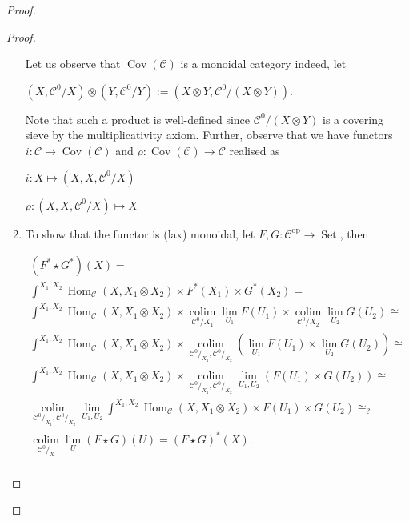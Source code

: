 \documentclass[8pt]{article}
\theoremstyle{definition}
\theoremstyle{definition}
\theoremstyle{definition}
\theoremstyle{definition}
\theoremstyle{definition}
\theoremstyle{definition}
\theoremstyle{definition}
\theoremstyle{definition}
\theoremstyle{definition}
\theoremstyle{definition}
\theoremstyle{definition}
\theoremstyle{definition}
\theoremstyle{definition}
\theoremstyle{question}
\DeclareMathOperator*{\colim}{\operatorname{colim}}
\begin{document}
\begin{proof}
\begin{proof}
\begin{enumerate}
    Let us observe that $\operatorname{Cov}(\mathcal{C})$ is a monoidal category indeed, let
    \begin{center}
      $(X, \mathcal{C}^{0}/X) \otimes (Y, \mathcal{C}^{0}/Y) := (X \otimes Y, \mathcal{C}^{0}/(X \otimes Y))$.
    \end{center}
    Note that such a product is well-defined since $\mathcal{C}^{0}/(X \otimes Y)$ is a covering sieve by the multiplicativity axiom.
    Further, observe that we have functors $i : \mathcal{C} \to \operatorname{Cov}(\mathcal{C})$ and $\rho : \operatorname{Cov}(\mathcal{C}) \to \mathcal{C}$
    realised as
    \begin{center}
      $i : X \mapsto (X, X, \mathcal{C}^{0}/X)$

      $\rho : (X, X, \mathcal{C}^{0}/X) \mapsto X$
    \end{center}
 
    
    \item To show that the functor is (lax) monoidal, let 
    $F, G : \mathcal{C}^{\operatorname{op}} \to \operatorname{Set}$, then
    
    \begin{multline*}
      (F^* \star G^*)(X) = \\
      \int^{X_1, X_2} \operatorname{Hom}_{\mathcal{C}}(X, X_1 \otimes X_2) \times F^*(X_1) \times G^*(X_2) = \\
      \int^{X_1, X_2} \operatorname{Hom}_{\mathcal{C}}(X, X_1 \otimes X_2) \times \colim \limits_{\mathcal{C}^{0}/X_1} \lim \limits_{U_1} F(U_1) \times \colim \limits_{\mathcal{C}^{0}/X_2} \lim \limits_{U_2} G(U_2) \cong \\
      \int^{X_1, X_2} \operatorname{Hom}_{\mathcal{C}}(X, X_1 \otimes X_2) \times \colim \limits_{\mathcal{C}^{0}/_{X_1}, \mathcal{C}^{0}/_{X_2}} (\lim \limits_{U_1} F(U_1) \times \lim \limits_{U_2} G(U_2)) \cong \\
      \int^{X_1, X_2} \operatorname{Hom}_{\mathcal{C}}(X, X_1 \otimes X_2) \times \colim \limits_{\mathcal{C}^{0}/_{X_1}, \mathcal{C}^{0}/_{X_2}} \lim \limits_{U_1, U_2} (F(U_1) \times G(U_2)) \cong \\
      \colim \limits_{\mathcal{C}^{0}/_{X_1}, \mathcal{C}^{0}/_{X_2}} \lim \limits_{U_1, U_2} \int^{X_1, X_2} \operatorname{Hom}_{\mathcal{C}}(X, X_1 \otimes X_2) \times F(U_1) \times G(U_2) \cong_? \\
      \colim \limits_{\mathcal{C}^{0}/_{X}} \lim \limits_{U} (F \star G)(U) = (F \star G)^*(X). \\
     \end{multline*}
  \end{enumerate}
\end{proof}
\end{proof}
\end{document}
